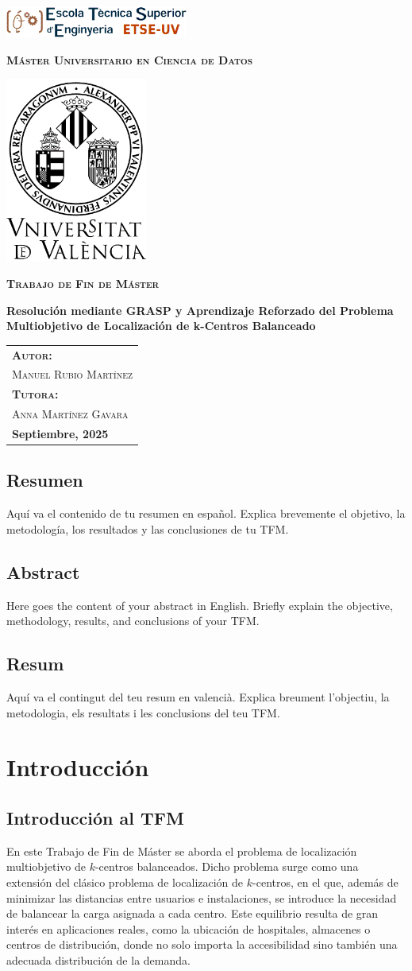 \documentclass[12pt,a4paper]{book}
\newcommand{\nuevaportada}[6]{
    \thispagestyle{empty}
    \begin{center}
        \vfill 
        
        \includegraphics[width=0.45\textwidth]{images/logo.png}
        
        \vspace{0.5cm} %
        {\large\bfseries\textsc{M\'aster Universitario en #1}\par} %
        
        \vspace{0.5cm}
        \includegraphics[width=0.35\textwidth]{images/uv.png} %
        
        \vspace{0.5cm}
        {\large\bfseries\textsc{Trabajo de Fin de M\'aster}\par} %
        
        \vfill 
        
        {\LARGE\bfseries #2\par} %
        
        \vfill %
        
        \begin{flushright}
            \begin{tabular}{l} 
                {\large\bfseries\textsc{Autor:}} \\
                {\large\textsc{#3}} \\ [0.2cm] %
                {\large\bfseries\textsc{Tutora:}} \\ 
                {\large\textsc{#4}} \\ [0.2cm] %
                {\large\bfseries #5} 
            \end{tabular}
        \end{flushright}
        
        \vfill %
    \end{center}
}
\begin{document}
\nuevaportada{Ciencia de Datos}{Resolución mediante GRASP y Aprendizaje Reforzado del Problema Multiobjetivo de Localización de k-Centros Balanceado }{Manuel Rubio Martínez}{Anna Martínez Gavara}{Septiembre, 2025}

\clearpage

\newpage
\tableofcontents

\newpage

\section*{Resumen}
Aquí va el contenido de tu resumen en español. Explica brevemente el objetivo, la metodología, los resultados y las conclusiones de tu TFM.

\newpage

\section*{Abstract}
Here goes the content of your abstract in English. Briefly explain the objective, methodology, results, and conclusions of your TFM.

\newpage

\section*{Resum}
Aquí va el contingut del teu resum en valencià. Explica breument l'objectiu, la metodologia, els resultats i les conclusions del teu TFM.

\newpage
 
\chapter{Introducción}

\section{Introducción al TFM}
En este Trabajo de Fin de Máster se aborda el problema de localización multiobjetivo de $k$-centros balanceados. Dicho problema surge como una extensión del clásico problema de localización de $k$-centros, en el que, además de minimizar las distancias entre usuarios e instalaciones, se introduce la necesidad de balancear la carga asignada a cada centro. Este equilibrio resulta de gran interés en aplicaciones reales, como la ubicación de hospitales, almacenes o centros de distribución, donde no solo importa la accesibilidad sino también una adecuada distribución de la demanda.
\end{document}
